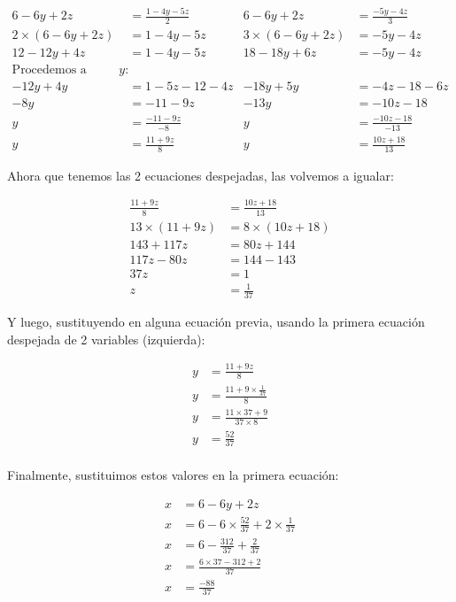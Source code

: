     \begin{align*}
        6-6y+2z &= \frac{1-4y-5z}{2}    & 6-6y+2z &= \frac{-5y-4z}{3}  		\\
        2\times(6-6y+2z )&= 1-4y-5z     & 3\times(6-6y+2z) &= -5y-4z        \\
        12-12y+4z &= 1-4y-5z            & 18-18y+6z &= -5y -4z \\
        \text{Procedemos a despejar la }y:\\
        -12y+4y &= 1-5z-12-4z           & -18y+5y &= -4z-18-6z \\
        -8y &= -11 -9z                  & -13y    &= -10z -18 \\
        y &= \frac{-11-9z}{-8}          & y &= \frac{-10z-18}{-13} \\
        y&= \frac{11+9z}{8}             & y&= \frac{10z+18}{13}
    \end{align*}

    Ahora que tenemos las 2 ecuaciones despejadas, las volvemos a igualar:

    \begin{align*}
        \frac{11+9z}{8}  &= \frac{10z+18}{13}  		\\
        13\times(11+9z)  &= 8\times(10z+18)     \\
        143+117z &= 80z +144\\
        117z-80z &= 144-143\\
        37z     &= 1 \\
        z &= \frac{1}{37}
    \end{align*}

    Y luego, sustituyendo en alguna ecuación previa, usando la primera ecuación
    despejada de 2 variables  (izquierda):

    \begin{align*}
        y &= \frac{11+9z}{8} \\
        y &= \frac{11+9\times \frac{1}{37} }{8}\\
        y&= \frac{11\times37+9}{37\times8}  \\
        y&= \frac{52}{37} \\
    \end{align*}

    Finalmente, sustituimos estos valores en la primera ecuación:

    \begin{align*}
        x&= 6-6y+2z	\\
        x &= 6- 6\times \frac{52}{37} + 2\times \frac{1}{37}\\
        x&= 6- \frac{312}{37} + \frac{2}{37} \\
        x &= \frac{6\times37 - 312 + 2}{37}\\
        x &=\frac{-88}{37}
    \end{align*}

